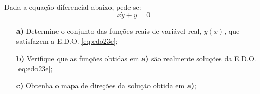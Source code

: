 \linespread{1.5}
Dada a equação diferencial abaixo, pede-se:
\begin{equation}
    \label{eq:edo23e}
    x\dot{y} + y = 0
\end{equation}
\begin{itemize}
    \item[\textbf{a)}] Determine o conjunto das funções reais de variável real, $y(x)$, que satisfazem a E.D.O. \ref{eq:edo23e};
    \item[\textbf{b)}] Verifique que as funções obtidas em \textbf{a)} são realmente soluções da E.D.O. \ref{eq:edo23e};
    \item[\textbf{c)}] Obtenha o mapa de direções da solução obtida em \textbf{a)};
\end{itemize}   